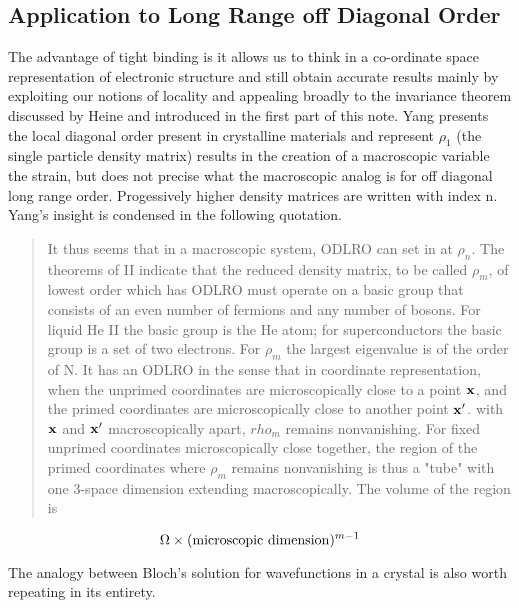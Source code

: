 \documentclass{article}
\def\x{{\bf x}}
\begin{document}
\subsection{Application to Long Range off Diagonal Order}
The advantage of tight binding is it allows us to think in a co-ordinate space representation
of electronic structure and still obtain accurate results mainly by exploiting our notions
of locality and appealing broadly to the invariance theorem discussed by Heine and introduced
in the first part of this note. Yang presents the local diagonal order present in crystalline materials
and represent $\rho_{1}$ (the single particle density matrix) results in the 
creation of a macroscopic variable the strain, but does not precise what the macroscopic 
analog is for off diagonal long range order. Progessively higher density matrices are 
written with index n. Yang's insight is condensed in the following quotation.
%
\begin{quote}
It thus seems that in a macroscopic system, ODLRO can set in 
at $\rho_{n}$. The theorems of II indicate that
the reduced density matrix, to be called $\rho_{m}$, of lowest
order which has ODLRO must operate on a basic group that consists 
of an even number of fermions and any number of bosons. For liquid He II the basic
group is the He atom; for superconductors the basic group is a set of two electrons.
For $\rho_{m}$ the largest eigenvalue is of the order of N. It has an ODLRO
in the sense that in coordinate representation, when the unprimed coordinates are
microscopically close to a point $\x$, and the primed coordinates are microscopically
close to another point $\x'$. with $\x$ and $\x'$ macroscopically apart, $rho_{m}$
remains nonvanishing. For fixed unprimed coordinates microscopically
close together, the region of the primed coordinates where
$\rho_{m}$ remains nonvanishing is thus a "tube" with one 3-space dimension 
extending macroscopically. The volume of the region is 
\end{quote}
\begin{equation}
\Omega \times ({\rm microscopic\ dimension})^{m-1}
\end{equation}
%

The analogy between Bloch's solution for wavefunctions in a crystal is also worth
repeating in its entirety.
\end{document}
